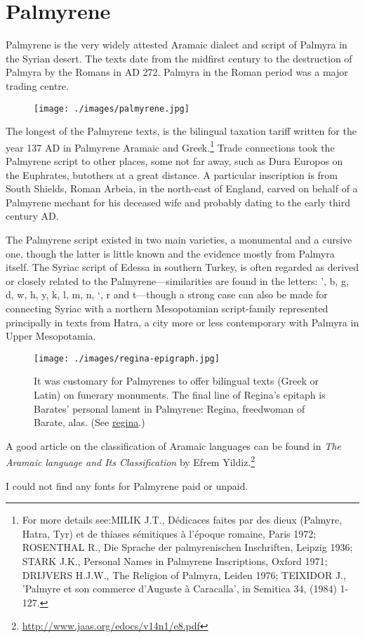 \newpage
\section{Palmyrene}
\arial

Palmyrene is the very widely attested Aramaic dialect and script
of Palmyra in the Syrian desert. The texts date from the midfirst century to the destruction of Palmyra by the Romans in AD 272. Palmyra in the Roman period was a major trading centre.
\medskip

\begin{figure}[ht]
\centering

\texttt{[image: ./images/palmyrene.jpg]}

\end{figure}

\medskip
The longest of the Palmyrene texts, is the bilingual  taxation tariff written for the year 137 AD in Palmyrene Aramaic and Greek.\footnote{For more details see:MILIK J.T., Dédicaces faites par des dieux (Palmyre, Hatra, 
Tyr) et de thiases sémitiques à l'époque romaine, Paris 1972; ROSENTHAL R., Die 
Sprache der palmyrenischen Inschriften, Leipzig 1936; STARK J.K., Personal Names in 
Palmyrene Inscriptions, Oxford 1971; DRIJVERS H.J.W., The Religion of Palmyra, 
Leiden 1976; TEIXIDOR J., 'Palmyre et son commerce d'Auguste à Caracalla', in 
Semitica 34, (1984) 1-127.  } Trade connections 
took the Palmyrene script to other places, some not far away, such as Dura Europos on the Euphrates, butothers at a great distance. A particular inscription is from South Shields, Roman Arbeia, in the north-east of England, carved on behalf of a Palmyrene mechant for his deceased wife and probably dating to the early third century AD. 

The Palmyrene script existed in two main varieties, a monumental and a cursive one, though the latter is little known and the evidence  mostly from Palmyra itself. The Syriac script of Edessa in southern Turkey, is often regarded as derived or closely related to the Palmyrene---similarities are found in the letters: ', b, g, d, w, h, y, k, l, m, n, `, r and t---though a strong case can also be made for connecting Syriac with a northern Mesopotamian script-family represented principally in texts from Hatra, a city more or less contemporary with Palmyra in Upper Mesopotamia. 


\begin{figure}[ht]
\texttt{[image: ./images/regina-epigraph.jpg]}
\caption{It was customary for Palmyrenes to offer bilingual texts (Greek or Latin) on funerary monuments. The final line of Regina's epitaph is Barates' personal lament in Palmyrene: Regina, freedwoman of Barate, alas. (See \href{http://www2.cnr.edu/home/araia/regina.html}{regina}.)}
\end{figure}

A good article on the classification of Aramaic languages can be found in \textit{The Aramaic language and Its Classification} by Efrem Yildiz.\footnote{\url{http://www.jaas.org/edocs/v14n1/e8.pdf}}

I could not find any fonts for Palmyrene paid or unpaid.


